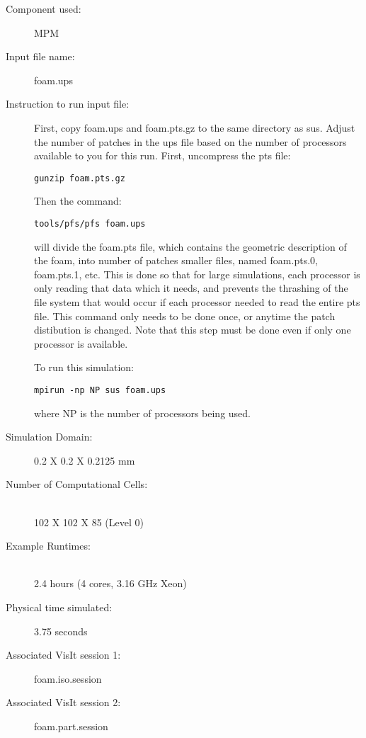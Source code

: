 \begin{description} 
\item [Component used:] \hfill MPM
\item [Input file name:] \hfill foam.ups
\item [Instruction to run input file:]

First, copy foam.ups and foam.pts.gz to the same directory as sus.
Adjust the number of patches in the ups file based on
the number of processors available to you for this run.
First, uncompress the pts file:
\begin{Verbatim}[fontsize=\footnotesize]
 gunzip foam.pts.gz
\end{Verbatim}

Then the command:
\begin{Verbatim}[fontsize=\footnotesize]
 tools/pfs/pfs foam.ups
\end{Verbatim}
will divide the foam.pts
file, which contains the geometric description of the foam,
into number of patches smaller files, named foam.pts.0,
foam.pts.1, etc.  This is done so that for large simulations,
each processor is only reading that data which it needs, and
prevents the thrashing of the file system that would occur
if each processor needed to read the entire pts file.  This
command only needs to be done once, or anytime the patch
distibution is changed.  Note that this step must be done even
if only one processor is available.

To run this simulation:
\begin{Verbatim}[fontsize=\footnotesize]
  mpirun -np NP sus foam.ups
\end{Verbatim}
where NP is the number of processors being used.

\item [Simulation Domain:]\hfill  0.2 X 0.2 X 0.2125 mm

\item [Number of Computational Cells:]\hfill \\ 
102 X 102 X 85 (Level 0)

\item [Example Runtimes:] \hfill \\
2.4 hours  (4 cores, 3.16 GHz Xeon)\\

\item [Physical time simulated:] \hfill 3.75 seconds

\item [Associated VisIt session 1:] \hfill foam.iso.session
\item [Associated VisIt session 2:] \hfill foam.part.session

\end{description}

